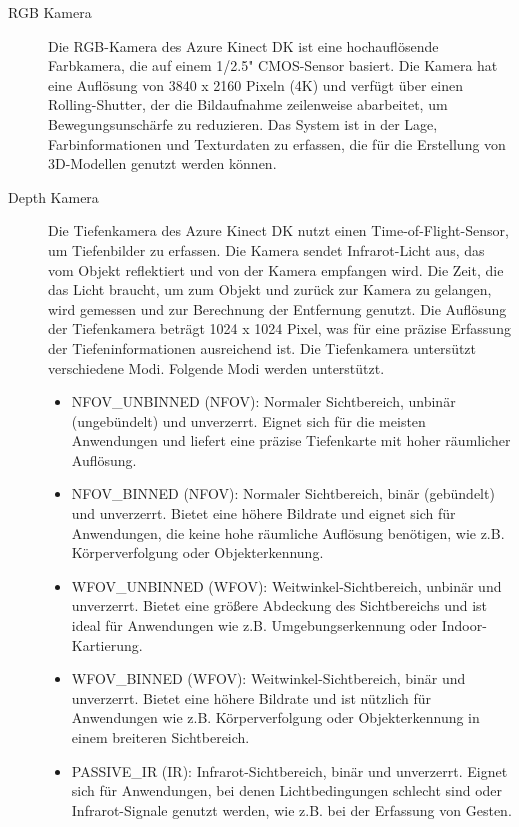 \begin{description}

    \label{azure-kamera}
    \item[RGB Kamera] Die RGB-Kamera des Azure Kinect DK ist eine hochauflösende Farbkamera, die auf einem 1/2.5" CMOS-Sensor basiert. Die Kamera hat eine Auflösung von 3840 x 2160 Pixeln (4K) und verfügt über einen Rolling-Shutter, der die Bildaufnahme zeilenweise abarbeitet, um Bewegungsunschärfe zu reduzieren. Das System ist in der Lage, Farbinformationen und Texturdaten zu erfassen, die für die Erstellung von 3D-Modellen genutzt werden können.
    \item[Depth Kamera] Die Tiefenkamera des Azure Kinect \ac{DK} nutzt einen Time-of-Flight-Sensor, um Tiefenbilder zu erfassen. Die Kamera sendet Infrarot-Licht aus, das vom Objekt reflektiert und von der Kamera empfangen wird. Die Zeit, die das Licht braucht, um zum Objekt und zurück zur Kamera zu gelangen, wird gemessen und zur Berechnung der Entfernung genutzt. Die Auflösung der Tiefenkamera beträgt 1024 x 1024 Pixel, was für eine präzise Erfassung der Tiefeninformationen ausreichend ist. Die Tiefenkamera untersützt verschiedene Modi. Folgende Modi werden unterstützt.

\begin{itemize}
        \item NFOV\_UNBINNED (NFOV): Normaler Sichtbereich, unbinär (ungebündelt) und unverzerrt. Eignet sich für die meisten Anwendungen und liefert eine präzise Tiefenkarte mit hoher räumlicher Auflösung.
        \item NFOV\_BINNED (NFOV): Normaler Sichtbereich, binär (gebündelt) und unverzerrt. Bietet eine höhere Bildrate und eignet sich für Anwendungen, die keine hohe räumliche Auflösung benötigen, wie z.B. Körperverfolgung oder Objekterkennung.
        \item WFOV\_UNBINNED (WFOV): Weitwinkel-Sichtbereich, unbinär und unverzerrt. Bietet eine größere Abdeckung des Sichtbereichs und ist ideal für Anwendungen wie z.B. Umgebungserkennung oder Indoor-Kartierung.
        \item WFOV\_BINNED (WFOV): Weitwinkel-Sichtbereich, binär und unverzerrt. Bietet eine höhere Bildrate und ist nützlich für Anwendungen wie z.B. Körperverfolgung oder Objekterkennung in einem breiteren Sichtbereich.
        \item PASSIVE\_IR (IR): Infrarot-Sichtbereich, binär und unverzerrt. Eignet sich für Anwendungen, bei denen Lichtbedingungen schlecht sind oder Infrarot-Signale genutzt werden, wie z.B. bei der Erfassung von Gesten.
    \end{itemize}
\end{description}

